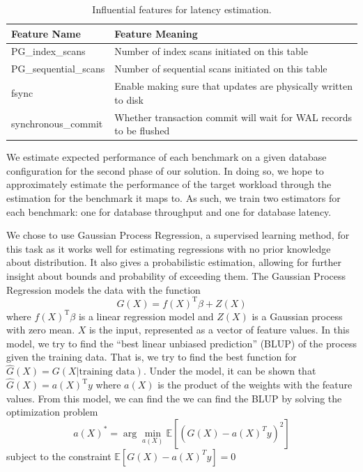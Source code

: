 \begin{table}[h!]
  \centering
  \begin{adjustbox}{max width=0.85\textwidth}
    \begin{tabular}{ll}
      \toprule
      Feature Name          & Feature Meaning                                                    \\
      \midrule
      PG\_index\_scans      & Number of index scans initiated on this table                      \\
      PG\_sequential\_scans & Number of sequential scans initiated on this table                 \\
      fsync                 & Enable making sure that updates are physically written to disk     \\
      synchronous\_commit   & Whether transaction commit will wait for WAL records to be flushed \\
      \bottomrule
    \end{tabular}
  \end{adjustbox}

  \caption{Influential features for latency estimation.}
  \label{tab:influential_features_for_latency}
\end{table}

We estimate expected performance of each benchmark on a given database
configuration for the second phase of our solution. In doing so, we
hope to approximately estimate the performance of the target workload
through the estimation for the benchmark it maps to. As such, we train
two estimators for each benchmark: one for database throughput and one
for database latency.

We chose to use Gaussian Process Regression, a supervised learning
method, for this task as it works well for estimating regressions with
no prior knowledge about distribution. It also gives a probabilistic
estimation, allowing for further insight about bounds and probability
of exceeding them. The Gaussian Process Regression models the data
with the function
\begin{equation*}
G(X) = f(X)^{\textrm{T}}\beta + Z(X)
\end{equation*}
where $f(X)^{\textrm{T}}\beta$ is a linear regression model and $Z(X)$
is a Gaussian process with zero mean. $X$ is the input, represented as
a vector of feature values.  In this model, we try to find the ``best
linear unbiased prediction'' (BLUP) of the process given the training
data. That is, we try to find the best function for
$\hat{G}(X) = G(X|\textrm{training data})$. Under the model, it can be
shown that $\hat{G}(X) = a(X)^{\textrm{T}}y$ where $a(X)$ is the
product of the weights with the feature values. From this model, we
can find the we can find the BLUP by solving the optimization problem
\begin{equation*}
a(X)^* = \arg \min\limits_{a(X)} \mathbb{E}[(G(X) - a(X)^T y)^2]
\end{equation*}
subject to the constraint $\mathbb{E}[G(X) - a(X)^T y] = 0$

